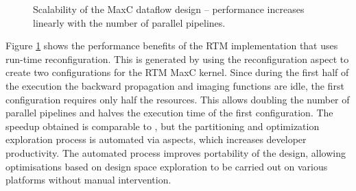 \begin{figure}[!h]
  \centering
  \caption{Scalability of the MaxC dataflow design -- performance
    increases linearly with the number of parallel pipelines.}
  \label{fig:scalability}
\end{figure}

Figure \ref{fig:scalability} shows the performance benefits of the RTM
implementation that uses run-time reconfiguration. This is generated
by using the reconfiguration aspect to create two configurations for
the RTM MaxC kernel. Since during the first half of the execution the
backward propagation and imaging functions are idle, the first
configuration requires only half the resources. This allows doubling
the number of parallel pipelines and halves the execution time of the
first configuration. The speedup obtained is comparable to
\cite{Xinyu:Qiwei:Luk:Qiang:Pell:2012}, but the partitioning and
optimization exploration process is automated via aspects, which
increases developer productivity. The automated process improves
portability of the design, allowing optimisations based on design
space exploration to be carried out on various platforms without
manual intervention.